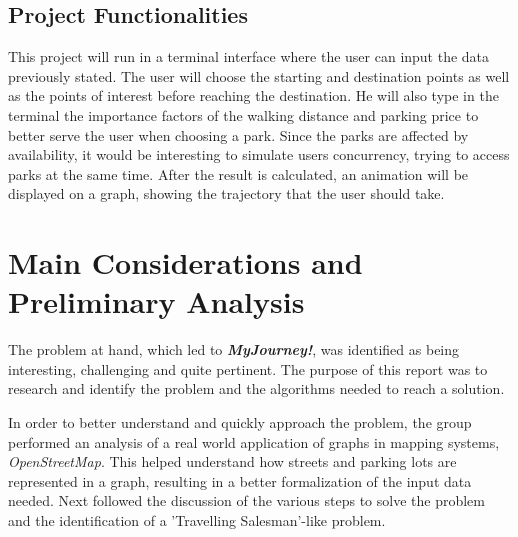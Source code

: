 \documentclass[a4paper, 12pt]{report}
\begin{document}
    \section{Project Functionalities}
    
    This project will run in a terminal interface where the user can input the data previously stated. The user will choose the starting and destination points as well as the points of interest before reaching the destination. He will also type in the terminal the importance factors of the walking distance and parking price to better serve the user when choosing a park. Since the parks are affected by availability, it would be interesting to simulate users concurrency, trying to access parks at the same time. After the result is calculated, an animation will be displayed on a graph, showing the trajectory that the user should take.
    
    \pagebreak
     
    \chapter{Main Considerations and Preliminary Analysis} %
    
    The problem at hand, which led to \textit{\textbf{MyJourney!}}, was identified as being interesting, challenging and quite pertinent. The purpose of this report was to research and identify the problem and the algorithms needed to reach a solution.
    
    In order to better understand and quickly approach the problem, the group performed an analysis of a real world application of graphs in mapping systems, \textit{OpenStreetMap}. This helped understand how streets and parking lots are represented in a graph, resulting in a better formalization of the input data needed. Next followed the discussion of the various steps to solve the problem and the identification of a 'Travelling Salesman'-like problem.
    
\end{document}
